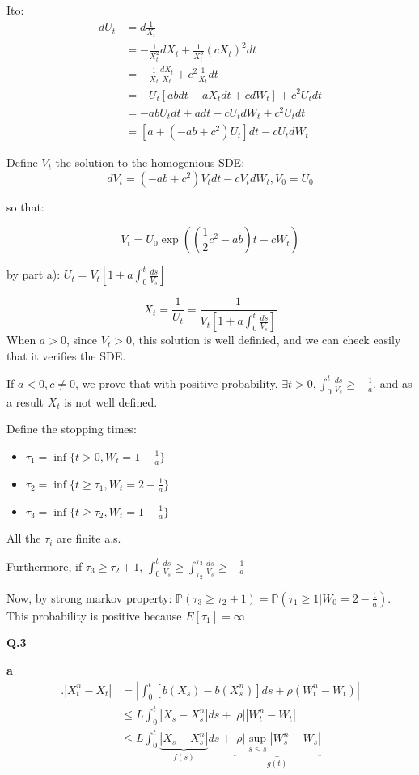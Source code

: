 \documentclass[11pt]{article}
\begin{document}
Ito:
\begin{align*}
dU_t
&=d\frac1{X_t}
\\&= -\frac1{X_t^2}dX_t + \frac1{X_t^3}(cX_t)^2dt
\\&= -\frac1{X_t} \frac{dX_t}{X_t} +  c^2\frac1{X_t} dt
\\&= -U_t [ab dt - aX_t dt + c dW_t] +  c^2U_t dt
\\&=  -abU_t dt + a dt - c U_tdW_t +  c^2U_t dt
\\&=  \left[a + (-ab + c^2) U_t\right] dt  - c U_t dW_t 
\end{align*}

Define \(V_t\) the solution to the homogenious SDE:
$$dV_t = (-ab + c^2)V_t dt - cV_t dW_t, V_0 = U_0$$

so that:

\[V_t= U_0 \exp\left((\frac12 c^2 - ab) t - c W_t\right) \]

by part a):
\(U_t = V_t\left[1 + a \int_0^t \frac{ds}{V_s}\right]\)


\[X_t = \frac1{U_t} = \frac1{V_t\left[ 1 + a \int_0^t \frac{ds}{V_s}\right]}\]
When \(a > 0\), since \(V_t > 0\), this solution is well definied, and we can check easily that it verifies the SDE.

If \(a < 0, c \ne 0\), we prove that with positive probability, \(\exists t > 0, \int_0^t \frac{ds}{V_s} \ge -\frac1a\), and as a result \(X_t\) is not well defined.

Define the stopping times:
\begin{itemize}
\item \(\tau_1 = \inf\{ t > 0, W_t = 1-\frac1a \}\)
\item \(\tau_2 = \inf\{ t \ge \tau_1, W_t = 2-\frac1a \}\)
\item \(\tau_3 = \inf\{ t \ge \tau_2, W_t = 1-\frac1a \}\)
\end{itemize}

All the \(\tau_i\) are finite a.s.

Furthermore, if \(\tau_3 \ge \tau_2 +1\), \(\int_0^t \frac{ds}{V_s} \ge \int_{\tau_2}^{\tau_3} \frac{ds}{V_s} \ge -\frac1a\)

Now, by strong markov property: \(\mathbb P(\tau_3 \ge \tau_2 + 1) = \mathbb P(\tau_1 \ge 1 | W_0 = 2 - \frac1a)\). This probability is positive because \(E[\tau_1] = \infty\)

\textbf{Q.3}

\textbf{a}
\begin{align*}
.|X_t^n - X_t| &= |\int_0^t [b(X_s) - b(X^n_s)] ds + \rho (W^n_t - W_t)|
\\&\le L \int_0^t |X_s - X^n_s| ds + |\rho| |W^n_t - W_t|
\\&\le L \int_0^t \underbrace{|X_s - X^n_s|}_{f(s)} ds + \underbrace{|\rho| \sup_{s \le s} |W^n_s - W_s|}_{g(t)}
\end{align*}
\end{document}
